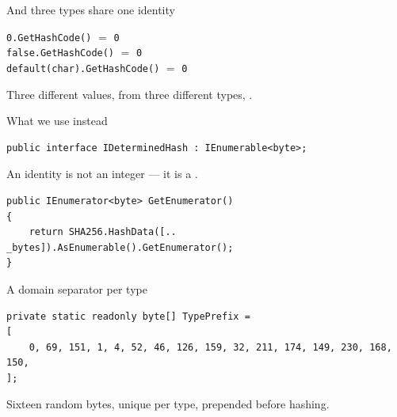 \documentclass[aspectratio=169,10pt,t]{beamer}
\begin{document}
\begin{frame}{And three types share one identity}
  \slidetop
  \begin{center}
    \large
    \texttt{0.GetHashCode()} \quad $=$ \quad \texttt{0}\\[0.6em]
    \texttt{false.GetHashCode()} \quad $=$ \quad \texttt{0}\\[0.6em]
    \texttt{default(char).GetHashCode()} \quad $=$ \quad \texttt{0}
  \end{center}
  \slidegap
  \begin{center}
    Three different values, from three different types,
    .
  \end{center}
\end{frame}

\begin{frame}[fragile]{What we use instead}
  \vspace{0.6em}
\begin{lstlisting}
public interface IDeterminedHash : IEnumerable<byte>;
\end{lstlisting}
  \vspace{0.8em}
  An identity is not an integer --- it is a .
  \vspace{0.8em}
\begin{lstlisting}
public IEnumerator<byte> GetEnumerator()
{
    return SHA256.HashData([.. _bytes]).AsEnumerable().GetEnumerator();
}
\end{lstlisting}
  \vspace{0.8em}
\end{frame}

\begin{frame}[fragile]{A domain separator per type}
  \vspace{0.7em}
\begin{lstlisting}
private static readonly byte[] TypePrefix =
[
    0, 69, 151, 1, 4, 52, 46, 126, 159, 32, 211, 174, 149, 230, 168, 150,
];
\end{lstlisting}
  \vspace{1.2em}
  Sixteen random bytes, unique per type, prepended before hashing.

  \vspace{1.0em}
\end{frame}
\end{document}
